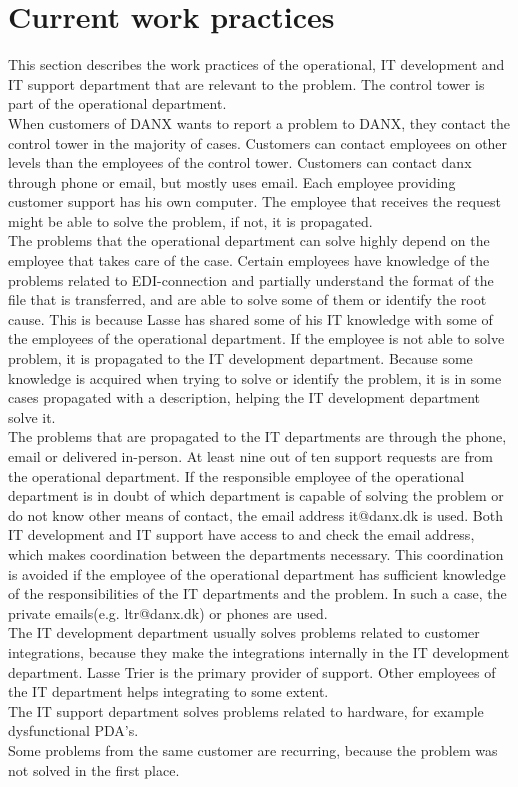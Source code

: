 \section{Current work practices}
\label{sec:workpractices}
This section describes the work practices of the operational, IT development and IT support department that are relevant to the problem. The control tower is part of the operational department.\\
When customers of DANX wants to report a problem to DANX, they contact the control tower in the majority of cases.\cite{gert004} Customers can contact employees on other levels than the employees of the control tower.\cite{gert007} Customers can contact danx through phone or email, but mostly uses email.\cite{gert020} Each employee providing customer support has his own computer.\cite{gert024} The employee that receives the request might be able to solve the problem, if not, it is propagated.\\
The problems that the operational department can solve highly depend on the employee that takes care of the case.\cite{lasse002} Certain employees have knowledge of the problems related to EDI-connection and partially understand the format of the file that is transferred, and are able to solve some of them or identify the root cause. This is because Lasse has shared some of his IT knowledge with some of the employees of the operational department.\cite{lasse006} If the employee is not able to solve problem, it is propagated to the IT development department. Because some knowledge is acquired when trying to solve or identify the problem, it is in some cases propagated with a description, helping the IT development department solve it.\cite{gert006}\cite{lasse005}\\
The problems that are propagated to the IT departments are through the phone, email or delivered in-person.\cite{gert019} At least nine out of ten support requests are from the operational department.\cite{lasse001} If the responsible employee of the operational department is in doubt of which department is capable of solving the problem or do not know other means of contact, the email address it@danx.dk is used.\cite{lasse003} Both IT development and IT support have access to and check the email address, which makes coordination between the departments necessary.\cite{lasse004} This coordination is avoided if the employee of the operational department has sufficient knowledge of the responsibilities of the IT departments and the problem. In such a case, the private emails(e.g. ltr@danx.dk) or phones are used.\\
The IT development department usually solves problems related to customer integrations, because they make the integrations internally in the IT development department. Lasse Trier is the primary provider of support.\cite{lahib004} Other employees of the IT department helps integrating to some extent.\cite{lahib002}\cite{lahib003}\\
The IT support department solves problems related to hardware, for example dysfunctional PDA’s.\cite{lasse003}\\
Some problems from the same customer are recurring, because the problem was not solved in the first place.\cite{gert009}

